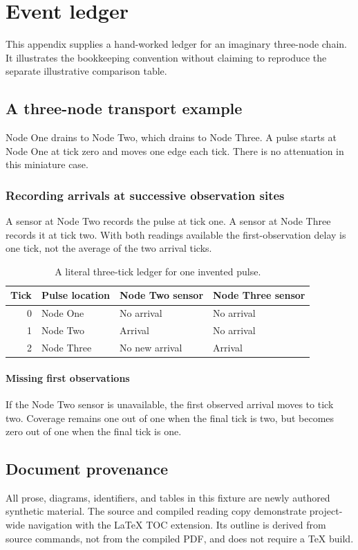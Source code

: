 \chapter{Event ledger}\label{demo-appendix}
This appendix supplies a hand-worked ledger for an imaginary three-node chain. It illustrates the bookkeeping convention without claiming to reproduce the separate illustrative comparison table.
\section{A three-node transport example}\label{demo-appendix-chain}
Node One drains to Node Two, which drains to Node Three. A pulse starts at Node One at tick zero and moves one edge each tick. There is no attenuation in this miniature case.
\subsection{Recording arrivals at successive observation sites}\label{demo-appendix-arrivals}
A sensor at Node Two records the pulse at tick one. A sensor at Node Three records it at tick two. With both readings available the first-observation delay is one tick, not the average of the two arrival ticks.
\begin{table}[htbp]
\centering
\begin{tabular}{rlll}
\hline
Tick & Pulse location & Node Two sensor & Node Three sensor \\
\hline
0 & Node One & No arrival & No arrival \\
1 & Node Two & Arrival & No arrival \\
2 & Node Three & No new arrival & Arrival \\
\hline
\end{tabular}
\caption{A literal three-tick ledger for one invented pulse.}\label{demo-tab-ledger}
\end{table}
\subsubsection{Missing first observations}\label{demo-appendix-missing}
If the Node Two sensor is unavailable, the first observed arrival moves to tick two. Coverage remains one out of one when the final tick is two, but becomes zero out of one when the final tick is one.
\section{Document provenance}\label{demo-appendix-provenance}
All prose, diagrams, identifiers, and tables in this fixture are newly authored synthetic material. The source and compiled reading copy demonstrate project-wide navigation with the LaTeX TOC extension. Its outline is derived from source commands, not from the compiled PDF, and does not require a TeX build.
